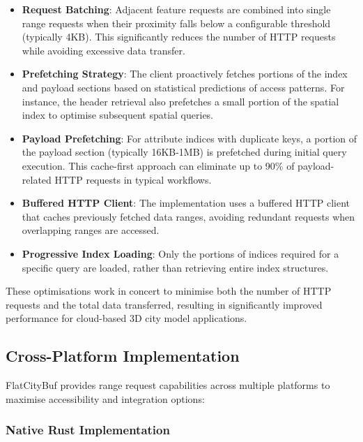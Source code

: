 \begin{itemize}
    \item \textbf{Request Batching}: Adjacent feature requests are combined into single range requests when their proximity falls below a configurable threshold (typically 4KB). This significantly reduces the number of HTTP requests while avoiding excessive data transfer.

    \item \textbf{Prefetching Strategy}: The client proactively fetches portions of the index and payload sections based on statistical predictions of access patterns. For instance, the header retrieval also prefetches a small portion of the spatial index to optimise subsequent spatial queries.

    \item \textbf{Payload Prefetching}: For attribute indices with duplicate keys, a portion of the payload section (typically 16KB-1MB) is prefetched during initial query execution. This cache-first approach can eliminate up to 90\% of payload-related HTTP requests in typical workflows.

    \item \textbf{Buffered HTTP Client}: The implementation uses a buffered HTTP client that caches previously fetched data ranges, avoiding redundant requests when overlapping ranges are accessed.

    \item \textbf{Progressive Index Loading}: Only the portions of indices required for a specific query are loaded, rather than retrieving entire index structures.
\end{itemize}

These optimisations work in concert to minimise both the number of HTTP requests and the total data transferred, resulting in significantly improved performance for cloud-based 3D city model applications.

\subsection{Cross-Platform Implementation}
\label{methodology:http_range_requests:cross_platform_implementation}

FlatCityBuf provides range request capabilities across multiple platforms to maximise accessibility and integration options:

\subsubsection{Native Rust Implementation}
\label{methodology:http_range_requests:cross_platform_implementation:native_rust}

